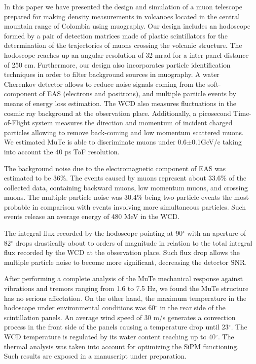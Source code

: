 \documentclass[letterpaper,11pt]{article}
\begin{document}
In this paper we have presented the design and simulation of a muon telescope prepared for making density measurements in volcanoes located in the central mountain range of Colombia using muography. Our design includes an hodoscope formed by a pair of detection matrices made of plastic scintillators for the determination of the trajectories of muons crossing the volcanic structure. The hodoscope reaches up an angular resolution of 32 mrad for a inter-panel distance of 250 cm. Furthermore, our design also incorporates particle identification techniques in order to filter background sources in muography. A water Cherenkov detector allows to reduce noise signals coming from the soft-component of EAS (electrons and positrons), and multiple particle events by means of energy loss estimation. The WCD also measures fluctuations in the cosmic ray background at the observation place. Additionally, a picosecond Time-of-Flight system measures the direction and momentum of incident charged particles allowing to remove back-coming and low momentum scattered muons. We estimated MuTe is able to discriminate muons under 0.6$\pm$0.1GeV/c taking into account the 40 ps ToF resolution.

The background noise due to the electromagnetic component of EAS was estimated to be 36$\%$. The events caused by muons represent about 33.6$\%$ of the collected data, containing backward muons, low momentum muons, and crossing muons. The multiple particle noise was 30.4$\%$ being two-particle events the most probable in comparison with events involving more simultaneous particles. Such events release an average energy of 480 MeV in the WCD. 

The integral flux recorded by the hodoscope pointing at 90$^{\circ}$ with an aperture of 82$^{\circ}$ drops drastically about to orders of magnitude in relation to the total integral flux recorded by the WCD at the observation place. Such flux drop allows the multiple particle noise to become more significant, decreasing the detector SNR.

After performing a complete analysis of the MuTe mechanical response against vibrations and tremors ranging from 1.6 to 7.5 Hz, we found the MuTe structure has no serious affectation. On the other hand, the maximum temperature in the hodoscope under environmental conditions was 60$^{\circ}$ in the rear side of the scintillation panels. An average wind speed of 30 m/s generates a convection process in the front side of the panels causing a temperature drop until 23$^{\circ}$. The WCD temperature is regulated by its water content reaching up to 40$^{\circ}$. The thermal analysis was taken into account for optimizing the SiPM functioning. Such results are exposed in a manuscript under preparation.
\end{document}
